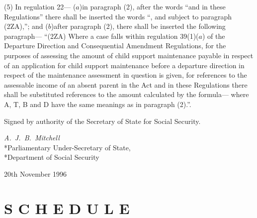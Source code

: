 \documentclass[a4paper]{article}
\newcommand{\parthead}{}
\begin{document}
(5) In regulation 22—
($a$)in paragraph (2), after the words “and in these Regulations” there shall be
inserted the words “, and subject to paragraph (2ZA),”; and
($b$)after paragraph (2), there shall be inserted the following paragraph—
“(2ZA) Where a case falls within regulation 39(1)($a$) of the Departure Direction
and Consequential Amendment Regulations, for the purposes of assessing the
amount of child support maintenance payable in respect of an application for
child support maintenance before a departure direction in respect of the
maintenance assessment in question is given, for references to the assessable
income of an absent parent in the Act and in these Regulations there shall be
substituted references to the amount calculated by the formula—
where A, T, B and D have the same meanings as in paragraph (2).”.

\bigskip

Signed by authority of the Secretary of State for Social Security.

{\raggedleft
\emph{A.\ J.\ B.\ Mitchell}\\*Parliamentary Under-Secretary of
State,\\*Department of Social Security

}

20th November 1996

\clearpage

\part[Schedule]{S C H E D U L E}

\renewcommand\parthead{--- Schedule}
\end{document}
